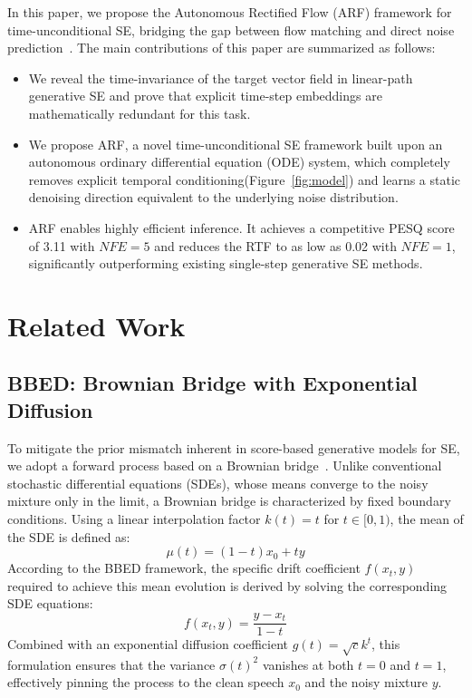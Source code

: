 \documentclass[cameraready]{Interspeech}
\begin{document}
In this paper, we propose the Autonomous Rectified Flow (ARF) framework for time-unconditional SE, bridging the gap between flow matching and direct noise prediction~\cite{10887784}. The main contributions of this paper are summarized as follows:
\begin{itemize}
\item We reveal the time-invariance of the target vector field in linear-path generative SE and prove that explicit time-step embeddings are mathematically redundant for this task.
\item We propose ARF, a novel time-unconditional SE framework built upon an autonomous ordinary differential equation (ODE) system, which completely removes explicit temporal conditioning(Figure~\ref{fig:model}) and learns a static denoising direction equivalent to the underlying noise distribution.
\item ARF enables highly efficient inference. It achieves a competitive PESQ score of 3.11 with $NFE=5$ and reduces the RTF to as low as 0.02 with $NFE=1$, significantly outperforming existing single-step generative SE methods.
\end{itemize}

\section{Related Work}
\subsection{BBED: Brownian Bridge with Exponential Diffusion}
To mitigate the prior mismatch inherent in score-based generative models for SE, we adopt a forward process based on a Brownian bridge~\cite{lay23_interspeech}. Unlike conventional stochastic differential equations (SDEs), whose means converge to the noisy mixture only in the limit, a Brownian bridge is characterized by fixed boundary conditions. Using a linear interpolation factor $k(t)=t$ for $t\in[0,1)$, the mean of the SDE is defined as:
\begin{equation}
    \mu(t) = (1 - t)x_0 + ty
\end{equation}
According to the BBED framework, the specific drift coefficient $f(x_t, y)$ required to achieve this mean evolution is derived by solving the corresponding SDE equations:
\begin{equation}
    f(x_t, y) = \frac{y - x_t}{1 - t}
\end{equation}
Combined with an exponential diffusion coefficient $g(t) = \sqrt{c}k^t$, this formulation ensures that the variance $\sigma(t)^2$ vanishes at both $t=0$ and $t=1$, effectively pinning the process to the clean speech $x_0$ and the noisy mixture $y$.
\end{document}
